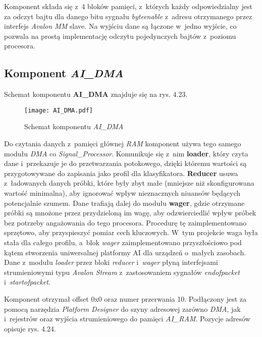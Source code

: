 Komponent składa się z~4 bloków pamięci, z~których każdy odpowiedzialny jest za odczyt bajtu dla danego bitu sygnału \textit{byteenable} z~adresu otrzymanego przez interfejs \textit{Avalon MM} slave. Na wyjściu dane są łączone w~jedno wyjście, co pozwala na prostą implementację odczytu pojedynczych bajtów z~poziomu procesora.
\subsection{Komponent \textit{AI\_DMA}}

Schemat komponentu \textbf{AI\_DMA} znajduje się na rys. 4.23.

\begin{figure}[h]
	\centering
	\texttt{[image: AI\_DMA.pdf]}
	\caption{Schemat komponentu \textit{AI\_DMA}}
\end{figure}

Do czytania danych z~pamięci głównej \textit{RAM} komponent używa tego samego modułu \textit{DMA} co \textit{Signal\_Processor}. Komunikuje się z~nim \textbf{loader}, który czyta dane i~przekazuje je do przetwarzania potokowego, dzięki któremu wartości są przygotowywane do zapisania jako profil dla klasyfikatora. \textbf{Reducer} usuwa z~ładowanych danych próbki, które były zbyt małe (mniejsze niż skonfigurowana wartość minimalna), aby ignorować wpływ nieznacznych niuansów będących potencjalnie szumem. Dane trafiają dalej do modułu \textbf{wager}, gdzie otrzymane próbki są mnożone przez przydzieloną im wagę, aby odzwierciedlić wpływ próbek bez potrzeby angażowania do tego procesora. Procedurę tę zaimplementowano sprzętowo, aby przyspieszyć pomiar cech kluczowych. W~tym projekcie waga była stała dla całego profilu, a~blok \textit{wager} zaimplementowano przyszłościowo pod kątem stworzenia uniwersalnej platformy AI dla urządzeń o~małych zasobach. Dane z~modułu \textit{loader} przez bloki \textit{reducer} i~\textit{wager} płyną interfejsami strumieniowymi typu \textit{Avalon Stream} z~zastosowaniem sygnałów \textit{endofpacket} i~\textit{startofpacket}.

Komponent otrzymał offset 0x0 oraz numer przerwania 10. Podłączony jest za pomocą narzędzia \textit{Platform Designer} do szyny adresowej zarówno \textit{DMA}, jak i~rejestrów oraz wyjścia strumieniowego do pamięci \textit{AI\_RAM}. Pozycje adresów opisuje rys. 4.24.

